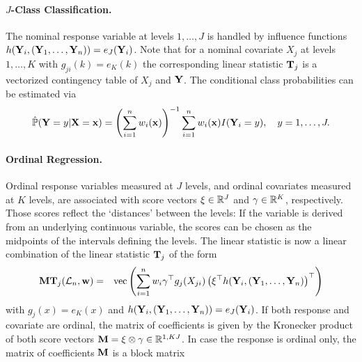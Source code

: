 \paragraph{$J$-Class Classification.}
The nominal response variable at levels $1, \dots, J$ 
is handled by influence
functions $h(\mathbf{Y}_i, (\mathbf{Y}_1, \dots, \mathbf{Y}_n)) = e_J(\mathbf{Y}_i)$. Note that for a
nominal covariate $X_j$ at levels $1, \dots, K$ with  
$g_{ji}(k) = e_K(k)$ the
corresponding linear statistic $\mathbf{T}_j$ is a vectorized contingency table 
of $X_j$ and $\mathbf{Y}$.
The conditional class probabilities can be estimated via 
\begin{eqnarray*}
\hat{\mathbb{P}}(\mathbf{Y} = y | \mathbf{X} = \mathbf{x}) = \left(\sum_{i=1}^n w_i(\mathbf{x})\right)^{-1}
\sum_{i=1}^n
w_i(\mathbf{x}) I(\mathbf{Y}_i = y), \quad y = 1, \dots, J.
\end{eqnarray*}

\paragraph{Ordinal Regression.}
Ordinal response variables measured at $J$ levels, and ordinal covariates
measured at $K$ levels, are associated with score vectors $\xi \in
\mathbb{R}^J$ and $\gamma \in \mathbb{R}^K$, respectively. Those scores reflect the
`distances' between the levels: If the variable is derived from an
underlying continuous variable, the scores can be chosen as the midpoints
of the intervals defining the levels. The linear statistic is now a linear
combination of the linear statistic $\mathbf{T}_j$ of the form
\begin{eqnarray*}
\mathbf{M} \mathbf{T}_j(\mathcal{L}_n, \mathbf{w}) & = & \text{vec} \left( \sum_{i=1}^n w_i \gamma^\top g_j(X_{ji})
            \left(\xi^\top h(\mathbf{Y}_i, (\mathbf{Y}_1, \dots, \mathbf{Y}_n)\right)^\top \right)
\end{eqnarray*}
with $g_j(x) = e_K(x)$ and $h(\mathbf{Y}_i, (\mathbf{Y}_1, \dots, \mathbf{Y}_n)) = e_J(\mathbf{Y}_i)$.
If both response and covariate are ordinal, the matrix of coefficients
is given by the Kronecker product of both score vectors $\mathbf{M} = \xi \otimes \gamma \in
\mathbb{R}^{1, KJ}$. In case the response is ordinal only, the matrix of 
coefficients $\mathbf{M}$ is a block matrix 
